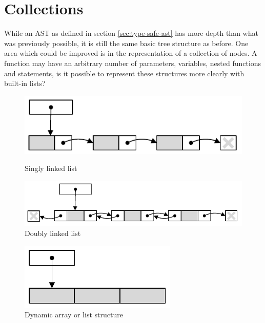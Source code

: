 \documentclass[twoside,openright]{uva-bachelor-thesis}
\begin{document}
	
	\section{Collections}
		While an AST as defined in section \ref{sec:type-safe-ast} has more depth than what was previously possible, it is still the same basic tree structure as before. One area which could be improved is in the representation of a collection of nodes. A function may have an arbitrary number of parameters, variables, nested functions and statements, is it possible to represent these structures more clearly with built-in lists?
		
		\begin{figure}[ht]
			\begin{minipage}[b]{0.45\linewidth}
				\centering
				\includegraphics[width=\textwidth]{figures/collections/sll}
				\caption{Singly linked list}
				\label{fig:sll}
			\end{minipage}
			\hspace{0.5cm}
			\begin{minipage}[b]{0.45\linewidth}
				\centering
				\includegraphics[width=\textwidth]{figures/collections/dll}
				\caption{Doubly linked list}
				\label{fig:dll}
			\end{minipage}
		\end{figure}
		\begin{figure}[h]
			\centering
			\includegraphics{figures/collections/list}
			\caption{Dynamic array or list structure}
			\label{fig:list}
		\end{figure}
		
\end{document}
